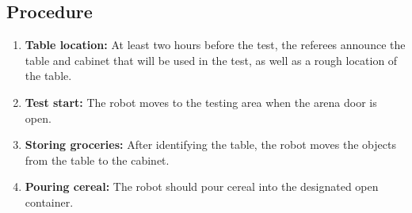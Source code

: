 \subsection*{Procedure}
\begin{enumerate}[nosep]
	\item \textbf{Table location:} At least two hours before the test, the referees announce the table and cabinet that will be used in the test, as well as a rough location of the table.
	\item \textbf{Test start:} The robot moves to the testing area when the arena door is open.
	\item \textbf{Storing groceries:} After identifying the table, the robot moves the objects from the table to the cabinet.
	\item \textbf{Pouring cereal:} The robot should pour cereal into the designated open container.
\end{enumerate}


